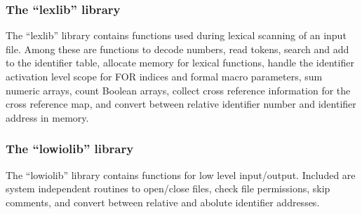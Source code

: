 \subsubsection{The ``lexlib'' library}
\label{sec:lexlib}
The ``lexlib'' library contains functions used during lexical scanning of
an input file.   Among these are functions to decode numbers, read tokens,
search and add to the identifier table, allocate memory for lexical functions,
handle the identifier activation level scope for FOR indices and formal
macro parameters, sum numeric arrays, count Boolean arrays, collect cross
reference information for the cross reference map, and convert between
relative identifier number and identifier address in memory.

\subsubsection{The ``lowiolib'' library}
\label{sec:lowiolib}
The ``lowiolib'' library contains functions for low level input/output.
Included are system independent routines to open/close files,
check file permissions,
skip comments,
and convert between relative and abolute identifier addresses.

